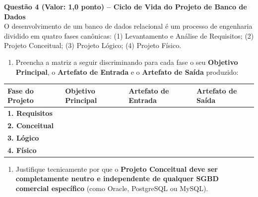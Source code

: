 \documentclass[11pt,a4paper]{article}
\begin{document}
\noindent\textbf{Questão 4 (Valor: 1,0 ponto) -- Ciclo de Vida do Projeto de Banco de Dados}\\[0.1cm]
O desenvolvimento de um banco de dados relacional é um processo de engenharia dividido em quatro fases canônicas: (1) Levantamento e Análise de Requisitos; (2) Projeto Conceitual; (3) Projeto Lógico; (4) Projeto Físico.
\begin{enumerate}[label=\alph*),itemsep=1pt]
  \item Preencha a matriz a seguir discriminando para cada fase o seu \textbf{Objetivo Principal}, o \textbf{Artefato de Entrada} e o \textbf{Artefato de Saída} produzido:
\end{enumerate}

\begin{center}
\footnotesize
\begin{tabularx}{\textwidth}{l p{4.2cm} p{4.5cm} X}
\toprule
\textbf{Fase do Projeto} & \textbf{Objetivo Principal} & \textbf{Artefato de Entrada} & \textbf{Artefato de Saída} \\
\midrule
\textbf{1. Requisitos} & & & \\
\addlinespace
\textbf{2. Conceitual} & & & \\
\addlinespace
\textbf{3. Lógico} & & & \\
\addlinespace
\textbf{4. Físico} & & & \\
\bottomrule
\end{tabularx}
\end{center}

\begin{enumerate}[label=\alph*),resume,itemsep=1pt]
  \item Justifique tecnicamente por que o \textbf{Projeto Conceitual deve ser completamente neutro e independente de qualquer SGBD comercial específico} (como Oracle, PostgreSQL ou MySQL).
\end{enumerate}
\end{document}
